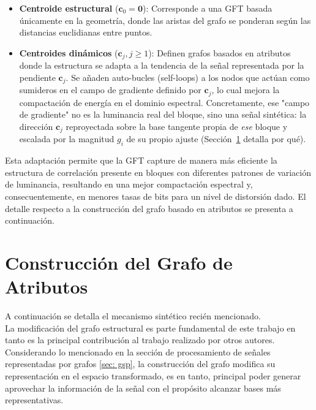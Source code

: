 \begin{itemize}
    \item \textbf{Centroide estructural} (\(\mathbf{c}_0 = \mathbf{0}\)): Corresponde a una GFT basada únicamente en la geometría, donde las aristas del grafo se ponderan según las distancias euclidianas entre puntos.
    
    \item \textbf{Centroides dinámicos} (\(\mathbf{c}_j, j \geq 1\)): Definen grafos basados en atributos donde la estructura se adapta a la tendencia de la señal representada por la pendiente \(\mathbf{c}_j\). Se añaden auto-bucles (self-loops) a los nodos que actúan como sumideros en el campo de gradiente definido por \(\mathbf{c}_j\), lo cual mejora la compactación de energía en el dominio espectral. Concretamente, ese "campo de gradiente" no es la luminancia real del bloque, sino una señal sintética: la dirección $\mathbf{c}_j$ reproyectada sobre la base tangente propia de \emph{ese} bloque y escalada por la magnitud $g_i$ de su propio ajuste (Sección~\ref{sec:attribute_graph} detalla por qué).
\end{itemize}

Esta adaptación permite que la GFT capture de manera más eficiente la estructura de correlación presente en bloques con diferentes patrones de variación de luminancia, resultando en una mejor compactación espectral y, consecuentemente, en menores tasas de bits para un nivel de distorsión dado. El detalle respecto a la construcción del grafo basado en atributos se presenta a continuación.

\section{Construcción del Grafo de Atributos}\label{sec:attribute_graph}
    A continuación se detalla el mecanismo sintético recién mencionado.\\

    La modificación del grafo estructural es parte fundamental de este trabajo en tanto es la principal contribución al trabajo realizado por otros autores. Considerando lo mencionado en la sección de procesamiento de señales representadas por grafos \ref{sec: gsp}, la construcción del grafo modifica su representación en el espacio transformado, es en tanto, principal poder generar aprovechar la información de la señal con el propósito alcanzar bases más representativas.\\

